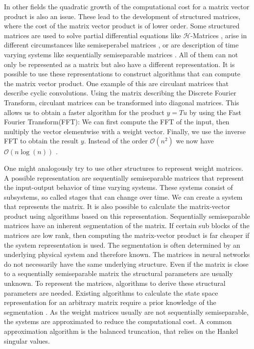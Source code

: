 \documentclass[doctype=mastersthesis,BCOR=15mm,biblatex]{ldvbook}%
\newcommand{\bigO}{\mathscr{O}}
\begin{document}
In other fields the quadratic growth of the computational cost for a matrix vector product is also an issue.
These lead to the development of structured matrices, where the cost of the matrix vector product is of lower order.
Some structured matrices are used to solve partial differential equations like $\mathcal{H}$-Matrices \cite{grasedyck_theorie_2001}, arise in different circumstances like semiseperabel matrices \cite{vandebril_bibliography_2005}, 
or are description of time varying systems like sequentially semiseparable matrices \cite{dewilde_time-varying_1998}.
All of them can not only be represented as a matrix but also have a different representation.
It is possible to use these representations to construct algorithms that can compute the matrix vector product.
One example of this are circulant matrices that describe cyclic convolutions.
Using the matrix describing the Discrete Fourier Transform, circulant matrices can be transformed into diagonal matrices.
This allows us to obtain a faster algorithm for the product $y=Tu$ by using the Fast Fourier Transform(FFT):
We can first compute the FFT of the input, then multiply the vector elementwise with a weight vector. Finally, we use the inverse FFT to obtain the result $y$.
Instead of the order $\bigO(n^2)$ we now have $\bigO(n\log(n))$ \cite{strang_computational_2007}.

One might analogously try to use other structures to represent weight matrices.
A possible representation are sequentially semiseparable matrices that represent the input-output behavior of time varying systems.
These systems consist of subsystems, so called stages that can change over time.
We can create a system that represents the matrix.
It is also possible to calculate the matrix-vector product using algorithms based on this representation.
Sequentially semiseparable matrices have an inherent segmentation of the matrix.
If certain sub blocks of the matrices are low rank, then computing the matrix-vector product is far cheaper if the system representation is used.
The segmentation is often determined by an underlying physical system and therefore known. 
The matrices in neural networks do not necessarily have the same underlying structure.
Even if the matrix is close to a sequentially semiseparable matrix the structural parameters are usually unknown.
To represent the matrices, algorithms to derive these structural parameters are needed.
Existing algorithms to calculate the state space representation for an arbitrary matrix require a prior knowledge of the segmentation \cite{chandrasekaran_fast_2002}.
As the weight matrices usually are not sequentially semiseparable, the systems are approximated to reduce the computational cost.
A common approximation algorithm is the balanced truncation, that relies on the Hankel singular values.
\end{document}
